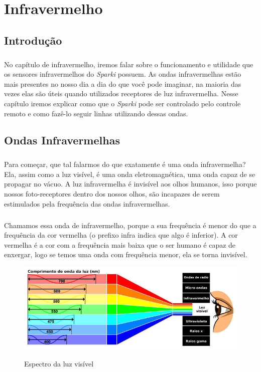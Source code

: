 \chapter{Infravermelho}

\section*{Introdução}

\paragraph{}
No capítulo de infravermelho, iremos falar sobre o funcionamento e utilidade que os sensores infravermelhos do \textit{Sparki} possuem. As ondas infravermelhas estão mais presentes no nosso dia a dia do que você pode imaginar, na maioria das vezes elas são úteis quando utilizados receptores de luz infravermelha. Nesse capítulo iremos explicar como que o \textit{Sparki} pode ser controlado pelo controle remoto e como fazê-lo seguir linhas utilizando dessas ondas.

\section{Ondas Infravermelhas}
\paragraph{}
Para começar, que tal falarmos do que exatamente é uma onda infravermelha? Ela, assim como a luz visível, é uma onda eletromagnética, uma onda capaz de se propagar no vácuo. A luz infravermelha é invisível aos olhos humanos, isso porque nossos foto-receptores dentro dos nossos olhos, são incapazes de serem estimulados pela frequência das ondas infravermelhas.
\paragraph{}
Chamamos essa onda de infravermelho, porque a sua frequência é menor do que a frequência da cor vermelha (o prefixo infra indica que algo é inferior). A cor vermelha é a cor com a frequência mais baixa que o ser humano é capaz de enxergar, logo se temos uma onda com frequência menor, ela se torna invisível.

    \begin{figure}[h]
    \caption{Espectro da luz visível}
     
    \centering 
    \includegraphics[width=14cm]{Figuras/espectro.jpg}
    \label{figura:espectro.jpeg}
    \end{figure}

